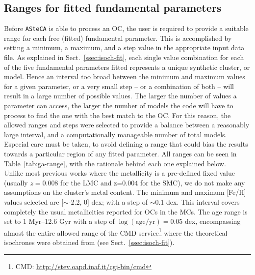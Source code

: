 \documentclass{aa}
\begin{document}

\subsection{Ranges for fitted fundamental parameters}
\label{ssec:param-ranges}

Before \texttt{ASteCA} is able to process an OC, the user is required to provide
a suitable range for each free (fitted) fundamental parameter. This is
accomplished by setting a minimum, a maximum, and a step value in the
appropriate input data file.
%
As explained in Sect.~\ref{ssec:isoch-fit}, each single value combination
for each of the five fundamental parameters fitted represents a unique synthetic
cluster, or model.
%
Hence an interval too broad between the minimum and maximum
values for a given parameter, or a very small step -- or a combination of
both -- will result in a large number of possible values.
The larger the number of values a parameter can access, the larger the number of
models the code will have to process to find the one with the best match to the
OC\@.
%
For this reason, the allowed ranges and steps were selected to provide
a balance between a reasonably large interval, and a computationally manageable
number of total models.
Especial care must be taken, to avoid defining a range that could bias the
results towards a particular region of any fitted parameter.
All ranges can be seen in Table~\ref{tab:ga-range}, with the rationale behind
each one explained below.\\

Unlike most previous works where the metallicity is a pre-defined fixed
value (usually $z=0.008$ for the LMC and z=$0.004$ for the SMC), we do not make
any assumptions on the cluster's metal content. The minimum and maximum [Fe/H]
values selected are [$\sim$-2.2, 0] dex; with a step of $\sim$0.1 dex. This
interval covers completely the usual metallicities reported for OCs in the MCs.
The age range is set to 1 Myr--12.6 Gyr with a step of
$\log\mathrm{(age/yr)}=0.05$ dex, encompassing almost the entire allowed range
of the CMD service\footnote{CMD\@: \url{http://stev.oapd.inaf.it/cgi-bin/cmd}}
where the theoretical isochrones were obtained from (see
Sect.~\ref{ssec:isoch-fit}).
\end{document}
